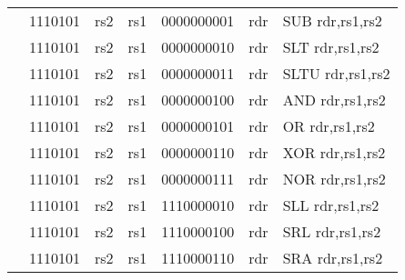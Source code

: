 \begin{table}[p]
\begin{small}
\begin{center}
\begin{tabular}{rcccccccccccl}
&
\multicolumn{2}{|c|}{1110101} &
\multicolumn{1}{c|}{rs2} &
\multicolumn{1}{c|}{rs1} &
\multicolumn{6}{c|}{0000000001} &
\multicolumn{1}{c|}{rdr} & SUB rdr,rs1,rs2 \\
\cline{2-12}
  

&
\multicolumn{2}{|c|}{1110101} &
\multicolumn{1}{c|}{rs2} &
\multicolumn{1}{c|}{rs1} &
\multicolumn{6}{c|}{0000000010} &
\multicolumn{1}{c|}{rdr} & SLT rdr,rs1,rs2 \\
\cline{2-12}
  

&
\multicolumn{2}{|c|}{1110101} &
\multicolumn{1}{c|}{rs2} &
\multicolumn{1}{c|}{rs1} &
\multicolumn{6}{c|}{0000000011} &
\multicolumn{1}{c|}{rdr} & SLTU rdr,rs1,rs2 \\
\cline{2-12}
  

&
\multicolumn{2}{|c|}{1110101} &
\multicolumn{1}{c|}{rs2} &
\multicolumn{1}{c|}{rs1} &
\multicolumn{6}{c|}{0000000100} &
\multicolumn{1}{c|}{rdr} & AND rdr,rs1,rs2 \\
\cline{2-12}
  

&
\multicolumn{2}{|c|}{1110101} &
\multicolumn{1}{c|}{rs2} &
\multicolumn{1}{c|}{rs1} &
\multicolumn{6}{c|}{0000000101} &
\multicolumn{1}{c|}{rdr} & OR rdr,rs1,rs2 \\
\cline{2-12}
  

&
\multicolumn{2}{|c|}{1110101} &
\multicolumn{1}{c|}{rs2} &
\multicolumn{1}{c|}{rs1} &
\multicolumn{6}{c|}{0000000110} &
\multicolumn{1}{c|}{rdr} & XOR rdr,rs1,rs2 \\
\cline{2-12}
  

&
\multicolumn{2}{|c|}{1110101} &
\multicolumn{1}{c|}{rs2} &
\multicolumn{1}{c|}{rs1} &
\multicolumn{6}{c|}{0000000111} &
\multicolumn{1}{c|}{rdr} & NOR rdr,rs1,rs2 \\
\cline{2-12}
  

&
\multicolumn{2}{|c|}{1110101} &
\multicolumn{1}{c|}{rs2} &
\multicolumn{1}{c|}{rs1} &
\multicolumn{6}{c|}{1110000010} &
\multicolumn{1}{c|}{rdr} & SLL rdr,rs1,rs2 \\
\cline{2-12}
  

&
\multicolumn{2}{|c|}{1110101} &
\multicolumn{1}{c|}{rs2} &
\multicolumn{1}{c|}{rs1} &
\multicolumn{6}{c|}{1110000100} &
\multicolumn{1}{c|}{rdr} & SRL rdr,rs1,rs2 \\
\cline{2-12}
  

&
\multicolumn{2}{|c|}{1110101} &
\multicolumn{1}{c|}{rs2} &
\multicolumn{1}{c|}{rs1} &
\multicolumn{6}{c|}{1110000110} &
\multicolumn{1}{c|}{rdr} & SRA rdr,rs1,rs2 \\
\cline{2-12}
  


\end{tabular}
\end{center}
\end{small}
\end{table}
